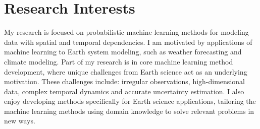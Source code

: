 \section*{Research Interests}
My research is focused on probabilistic machine learning methods for modeling data with spatial and temporal dependencies.
I am motivated by applications of machine learning to Earth system modeling, such as weather forecasting and climate modeling.
Part of my research is in core machine learning method development, where unique challenges from Earth science act as an underlying motivation.
These challenges include: irregular observations, high-dimensional data, complex temporal dynamics and accurate uncertainty estimation.
I also enjoy developing methods specifically for Earth science applications, tailoring the machine learning methods using domain knowledge to solve relevant problems in new ways.
